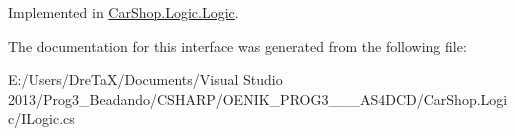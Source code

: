 Implemented in \mbox{\hyperlink{class_car_shop_1_1_logic_1_1_logic_a6534bb6d8a60c3afa39c99dd1fe0747b}{Car\+Shop.\+Logic.\+Logic}}.



The documentation for this interface was generated from the following file\+:\begin{DoxyCompactItemize}
\item 
E\+:/\+Users/\+Dre\+Ta\+X/\+Documents/\+Visual Studio 2013/\+Prog3\+\_\+\+Beadando/\+C\+S\+H\+A\+R\+P/\+O\+E\+N\+I\+K\+\_\+\+P\+R\+O\+G3\+\_\+\_\+\_\+\+A\+S4\+D\+C\+D/\+Car\+Shop.\+Logic/I\+Logic.\+cs\end{DoxyCompactItemize}
